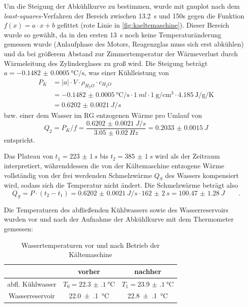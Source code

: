 Um die Steigung der Abkühlkurve zu bestimmen, wurde mit gnuplot nach dem \emph{least-squares-}Verfahren der Bereich zwischen \SI{13.2}{s} und {150}{s} gegen die Funktion $f(x)=a\cdot x+b$ gefittet (rote Linie in \cref{fig:kaeltemaschine}). Dieser Bereich wurde so gewählt, da in den ersten \SI{13}{s} noch keine Temperaturänderung gemessen wurde (Anlaufphase des Motors, Reagenzglas muss sich erst abkühlen) und da bei größerem Abstand zur Zimmertemperatur der Wärmeverlust durch Wärmeleitung des Zylinderglases zu groß wird.
Die Steigung beträgt $a=\SI{-0.1482(5)}{\degreeCelsius\per\s}$, was einer Kühlleistung von 
\begin{align}
	P_K&=|a|\cdot V\cdot\rho_{H_2O}\cdot c_{H_2O}\\
	&=\SI{-0.1482(5)}{\degreeCelsius\per\s}\cdot \SI{1}{ml}\cdot\SI{1}{\g\per\cubic\cm}\cdot \SI{4.185}{\joule\per\gram\per\kelvin} \\
	&=\SI{0.6202(21)}{J/s}
\label{eq:kuehlleistung}
\end{align}
bzw. einer dem Wasser im RG entzogenen Wärme pro Umlauf von 
\begin{equation}
	Q_2=P_K/f=\frac{\SI{0.6202(21)}{J/s}}{\SI{3.05(2)}{Hz}}=\SI{0.2033(15)}{J}
\label{eq:kuehlleistung}
\end{equation}
entspricht.

Das Plateau von $t_1=\SI{223(1)}{s}$ bis $t_2=\SI{385(1)}{s}$ wird als der Zeitraum interpretiert, währenddessen die von der Kältemaschine entzogene Wärme vollständig von der frei werdenden Schmelzwärme $Q_S$ des Wassers kompensiert wird, sodass sich die Temperatur nicht ändert. Die Schmelzwärme beträgt also 
\begin{equation}
	Q_S=P\cdot (t_2-t_1)=\SI{0.6202(21)}{J/s}\cdot\SI{162(2)}{s}=\SI{100.47(128)}{J}\qquad.
\label{eq:schmelzberechnet}
\end{equation}

Die Temperaturen des abfließenden Kühlwassers sowie des Wasserreservoirs wurden vor und nach der Aufnahme der Abkühlkurve mit dem Thermometer gemessen:
\begin{table}[H]
\centering
\begin{tabular}{c | c c}
		& vorher & nachher  \\ \midrule
		abfl. Kühlwasser & $T_0=\SI{22.3(1)}{\degreeCelsius}$ & $T_1=\SI{23.9(1)}{\degreeCelsius}$ \\
		Wasserreservoir & \SI{22.0(1)}{\degreeCelsius} & \SI{22.8(1)}{\degreeCelsius}
\end{tabular}
\caption{Wassertemperaturen vor und nach Betrieb der Kältemaschine}
\label{tab:wassertemps}
\end{table}

